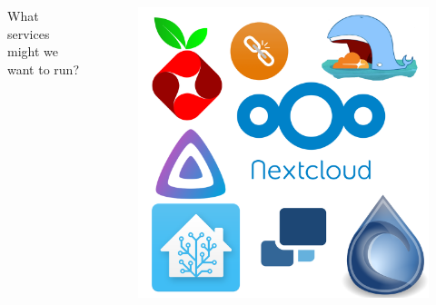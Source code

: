 \documentclass{beamer}
\begin{document}
\begin{frame}
    \begin{columns}
        \begin{column}{0.5\textwidth}
            What services might we want to run?
        \end{column}
        \begin{column}{0.5\textwidth}
            \begin{figure}
                \centering
                \includegraphics[width=\textwidth,keepaspectratio]{../resources/logos.png}
            \end{figure}
        \end{column}
    \end{columns}
\end{frame}
\end{document}
